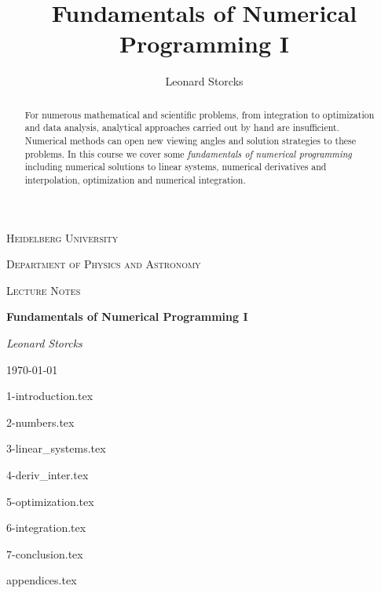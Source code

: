\documentclass[a4paper, 12pt]{article}
\title{Fundamentals of Numerical Programming I}
\author{Leonard Storcks}
\theoremstyle{definition}
\begin{document}
\begin{titlepage}
	\centering
	{\scshape\LARGE Heidelberg University \par}
	\vspace{0.5cm}
	{\scshape\LARGE Department of Physics and Astronomy \par}
	\vspace{1cm}
	{\scshape\Large Lecture Notes\par}
	\vspace{1.5cm}
	{\huge\bfseries Fundamentals of Numerical Programming I \par}
	\vspace{2cm}
	{\Large\itshape Leonard Storcks\par}
	\vfill
    \par
	\vfill
\vfill
	{\large \today\par}
\end{titlepage}

\begin{abstract}
  For numerous mathematical and scientific problems, from integration to 
  optimization and data analysis, analytical approaches carried out by hand are insufficient. 
  Numerical methods can open new viewing angles and solution strategies to these problems.
  In this course we cover some \textit{fundamentals of numerical programming} including
  numerical solutions to linear systems, numerical derivatives and interpolation, optimization
  and numerical integration.
\end{abstract}

\thispagestyle{empty}

\pagebreak

\thispagestyle{plain}

\tableofcontents

\thispagestyle{empty}

\pagebreak

\setcounter{page}{1} %



{1-introduction.tex}

{2-numbers.tex}

{3-linear_systems.tex}

{4-deriv_inter.tex}

{5-optimization.tex}

{6-integration.tex}

{7-conclusion.tex}


\pagebreak
\thispagestyle{plain}
\printbibliography[title={References}]
\pagebreak


{appendices.tex}

\end{document}
